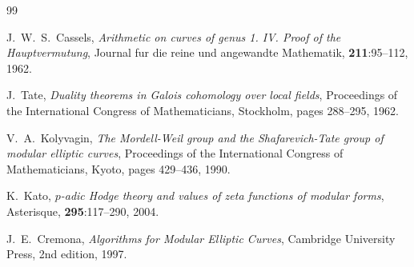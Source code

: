 \documentclass[11pt,a4paper]{article}
\theoremstyle{definition}
\begin{document}
\begin{thebibliography}{99}

J.~W.~S.~Cassels,
\textit{Arithmetic on curves of genus 1. IV. Proof of the Hauptvermutung},
Journal fur die reine und angewandte Mathematik, \textbf{211}:95--112, 1962.

J.~Tate,
\textit{Duality theorems in Galois cohomology over local fields},
Proceedings of the International Congress of Mathematicians, Stockholm, pages 288--295, 1962.

V.~A.~Kolyvagin,
\textit{The Mordell-Weil group and the Shafarevich-Tate group of modular elliptic curves},
Proceedings of the International Congress of Mathematicians, Kyoto, pages 429--436, 1990.

K.~Kato,
\textit{$p$-adic Hodge theory and values of zeta functions of modular forms},
Asterisque, \textbf{295}:117--290, 2004.

J.~E.~Cremona,
\textit{Algorithms for Modular Elliptic Curves},
Cambridge University Press, 2nd edition, 1997.

\end{thebibliography}
\end{document}
